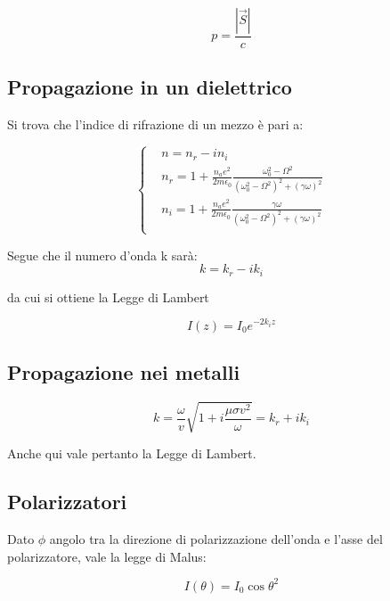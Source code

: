 \documentclass{article}
\begin{document}
\begin{equation}
    p=\frac{|\Vec{S}|}{c}
\end{equation}

\subsection{Propagazione in un dielettrico}
Si trova che l'indice di rifrazione di un mezzo è pari a:

\begin{equation}
    \left\{
    \begin{aligned}
    & n=n_r-in_i \\
        & n_r= 1+ \frac{n_a e^2}{2 m \epsilon_0}\frac{\omega_0^2-\Omega^2}{
        (\omega_0^2-\Omega^2)^2+(\gamma\omega)^2
        } \\
        &  n_i= 1+ \frac{n_a e^2}{2 m \epsilon_0}\frac{\gamma\omega}{
        (\omega_0^2-\Omega^2)^2+(\gamma\omega)^2
        } \\
    \end{aligned}
    \right.
\end{equation}

Segue che il numero d'onda k sarà:
\begin{equation}
    k= k_r-ik_i
\end{equation}

da cui si ottiene la Legge di Lambert

\begin{equation}
    I(z)= I_0e^{-2k_iz}
\end{equation}

\subsection{Propagazione nei metalli}
\begin{equation}
    k=\frac{\omega}{v}\sqrt{1+i\frac{\mu\sigma v^2}{\omega}}=k_r+ik_i
\end{equation}

Anche qui vale pertanto la Legge di Lambert.

\subsection{Polarizzatori}
Dato $\phi$ angolo tra la direzione di polarizzazione dell'onda e l'asse del polarizzatore, vale la legge di Malus:

\begin{equation}
    I(\theta)=I_0\cos{\theta}^2
\end{equation}
\end{document}
